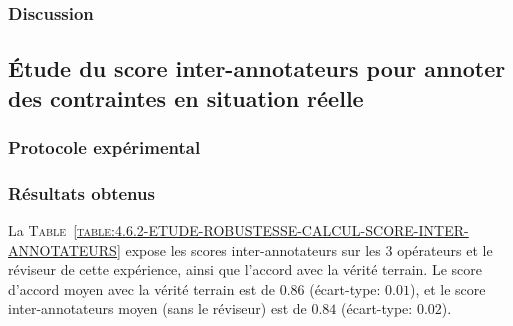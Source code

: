 		\subsubsection{Discussion}
		
			
	
	
	\subsection{Étude du score inter-annotateurs pour annoter des contraintes en situation réelle}
	\label{section:4.6.2-ETUDE-ROBUSTESSE-CALCUL-SCORE-INTER-ANNOTATEURS}
		
	
		\subsubsection{Protocole expérimental}
	
		\subsubsection{Résultats obtenus}
		
			La \textsc{Table~\ref{table:4.6.2-ETUDE-ROBUSTESSE-CALCUL-SCORE-INTER-ANNOTATEURS}} expose les scores inter-annotateurs sur les $3$ opérateurs et le réviseur de cette expérience, ainsi que l'accord avec la vérité terrain.
			Le score d'accord moyen avec la vérité terrain est de $0.86$ (écart-type: $0.01$), et le score inter-annotateurs moyen (sans le réviseur) est de $0.84$ (écart-type: $0.02$).
			

